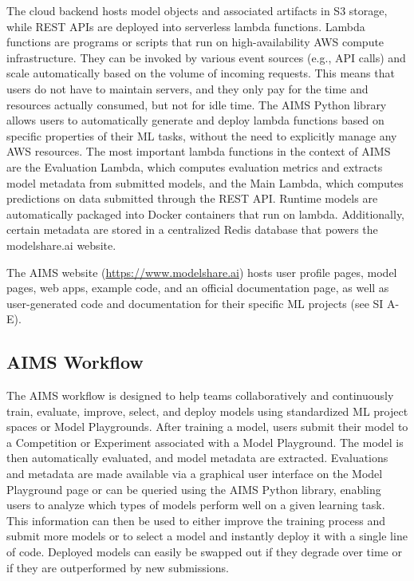 The cloud backend hosts model objects and associated artifacts in S3 storage, while REST APIs are deployed into serverless lambda functions. Lambda functions are programs or scripts that run on high-availability AWS compute infrastructure. They can be invoked by various event sources (e.g., API calls) and scale automatically based on the volume of incoming requests. This means that users do not have to maintain servers, and they only pay for the time and resources actually consumed, but not for idle time. The AIMS Python library allows users to automatically generate and deploy lambda functions based on specific properties of their ML tasks, without the need to explicitly manage any AWS resources. The most important lambda functions in the context of AIMS are the Evaluation Lambda, which computes evaluation metrics and extracts model metadata from submitted models, and the Main Lambda, which computes predictions on data submitted through the REST API. Runtime models are automatically packaged into Docker containers that run on lambda. Additionally, certain metadata are stored in a centralized Redis database that powers the modelshare.ai website. %

The AIMS website (\href{https://www.modelshare.ai}{https://www.modelshare.ai}) hosts user profile pages, model pages, web apps, example code, and an official documentation page, as well as user-generated code and documentation for their specific ML projects (see SI A-E). 


\subsection{AIMS Workflow}
The AIMS workflow is designed to help teams collaboratively and continuously train, evaluate, improve, select, and deploy models using standardized ML project spaces or Model Playgrounds. After training a model, users submit their model to a Competition or Experiment associated with a Model Playground. The model is then automatically evaluated, and model metadata are extracted. Evaluations and metadata are made available via a graphical user interface on the Model Playground page or can be queried using the AIMS Python library, enabling users to analyze which types of models perform well on a given learning task. This information can then be used to either improve the training process and submit more models or to select a model and instantly deploy it with a single line of code. Deployed models can easily be swapped out if they degrade over time or if they are outperformed by new submissions. 


